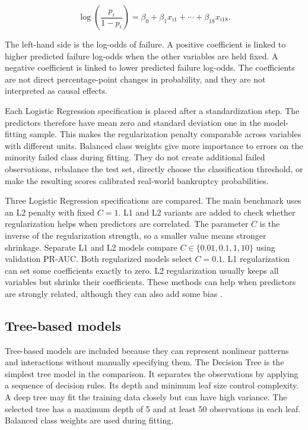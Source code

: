 \documentclass[11pt,a4paper]{article}
\begin{document}
\begin{equation}
  \log\left(\frac{p_i}{1-p_i}\right)
  = \beta_0 + \beta_1 x_{i1} + \cdots + \beta_{18} x_{i18}.
\end{equation}

The left-hand side is the log-odds of failure. A positive coefficient is linked
to higher predicted failure log-odds when the other variables are held fixed. A
negative coefficient is linked to lower predicted failure log-odds. The
coefficients are not direct percentage-point changes in probability, and they
are not interpreted as causal effects.

Each Logistic Regression specification is placed after a standardization step.
The predictors therefore have mean zero and standard deviation one in the
model-fitting sample. This makes the regularization penalty comparable across
variables with different units. Balanced class weights give more importance to
errors on the minority failed class during fitting. They do not create
additional failed observations, rebalance the test set, directly choose the
classification threshold, or make the resulting scores calibrated real-world
bankruptcy probabilities.

Three Logistic Regression specifications are compared. The main benchmark uses
an L2 penalty with fixed $C=1$. L1 and L2 variants are added to check whether
regularization helps when predictors are correlated. The parameter $C$ is the
inverse of the regularization strength, so a smaller value means stronger
shrinkage. Separate L1 and L2 models compare
$C \in \{0.01, 0.1, 1, 10\}$ using validation PR-AUC. Both regularized models
select $C=0.1$. L1 regularization can set some coefficients exactly to zero. L2
regularization usually keeps all variables but shrinks their coefficients. These
methods can help when predictors are strongly related, although they can also
add some bias \citep{james2023}.

\subsection{Tree-based models}

Tree-based models are included because they can represent nonlinear patterns and
interactions without manually specifying them. The Decision Tree is the simplest
tree model in the comparison. It separates the observations by applying a
sequence of decision rules. Its depth and minimum leaf size control complexity. A deep tree
may fit the training data closely but can have high variance. The selected tree
has a maximum depth of 5 and at least 50 observations in each leaf. Balanced
class weights are used during fitting.
\end{document}
